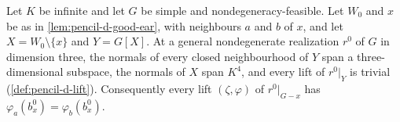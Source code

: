 \begin{lemma}
  \label{lem:pencil-d-ear-free}
  \leanok
  Let $K$ be infinite and let $G$ be simple and nondegeneracy-feasible.
  Let $W_0$ and $x$ be as in \cref{lem:pencil-d-good-ear}, with
  neighbours $a$ and $b$ of $x$, and let $X = W_0 \setminus \{x\}$ and
  $Y = G[X]$. At a general nondegenerate realization $r^0$ of $G$ in
  dimension three, the normals of every closed neighbourhood of $Y$ span
  a three-dimensional subspace, the normals of $X$ span $K^4$, and every
  lift of $r^0|_Y$ is trivial (\cref{def:pencil-d-lift}). Consequently
  every lift $(\zeta, \varphi)$ of $r^0|_{G - x}$ has
  $\varphi_a(b^0_x) = \varphi_b(b^0_x)$.
\end{lemma}
